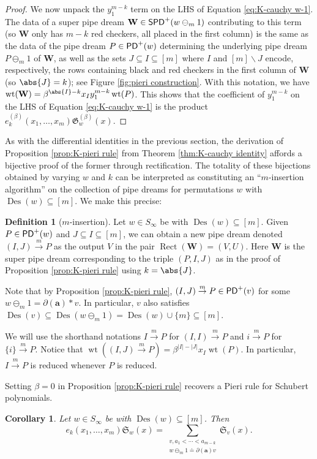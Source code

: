 \documentclass[11pt,reqno]{amsart} %
\newcommand{\frakS}{\mathfrak{S}}
\newcommand{\frakG}{\mathfrak{G}}
\newcommand{\bfa}{\mathbf{a}}
\newcommand{\bfW}{\mathbf{W}}
\newcommand{\sseq}{\subseteq}
\newcommand{\sm}{\smallsetminus}
\newcommand{\msert}{\overset{m}{\rightarrow}}
\DeclareMathOperator{\Des}{Des}
\DeclareMathOperator{\wt}{wt}
\DeclareMathOperator{\PD}{\sf{PD}}
\DeclareMathOperator{\SPD}{\sf{SPD}}
\DeclareMathOperator{\Rect}{Rect} %
\newtheorem{corollary}[theorem]{Corollary}
\theoremstyle{definition}
\newtheorem{definition}[theorem]{Definition}
\begin{document}
\begin{proof}
We now unpack the $y_1^{m-k}$ term on the LHS of Equation \ref{eq:K-cauchy w-1}.
The data of a super pipe dream $\bfW\in \SPD^+(w\ominus_m 1)$ contributing to this term (so $\bfW$ only has $m-k$ red checkers, all placed in the first column) is the same as the data of the pipe dream $P\in \PD^+(w)$ determining the underlying pipe dream $P\ominus_m 1$ of $\bfW$, as well as the sets $J\sseq I\sseq [m]$ where $I$ and $[m]\sm J$ encode, respectively, the rows containing black and red checkers in the first column of $\bfW$ (so $\abs{J} = k$); see Figure \ref{fig:pieri construction}.
With this notation, we have $\wt(\bfW) = \beta^{\abs{I}-k}x_Iy_1^{m-k}\wt(P)$.
This shows that the coefficient of $y_1^{m-k}$ on the LHS of Equation \ref{eq:K-cauchy w-1} is the product $e_k^{(\beta)}(x_1,\dots,x_m)\frakG_w^{(\beta)}(x)$.
\end{proof}

As with the differential identities in the previous section, the derivation of Proposition \ref{prop:K-pieri rule} from Theorem \ref{thm:K-cauchy identity} affords a bijective proof of the former through rectification.
The totality of these bijections obtained by varying $w$ and $k$ can be interpreted as constituting an ``$m$-insertion algorithm'' on the collection of pipe dreams for permutations $w$ with $\Des(w)\sseq [m]$.
We make this precise:

\begin{definition}[$m$-insertion]
\label{def:insertion}
Let $w\in S_\infty$ be with $\Des(w)\sseq [m]$.
Given $P\in \PD^+(w)$ and $J\sseq I\sseq [m]$, we can obtain a new pipe dream denoted $(I,J)\msert P$ as the output $V$ in the pair $\Rect(\bfW) = (V,U)$.
Here $\bfW$ is the super pipe dream corresponding to the triple $(P,I,J)$ as in the proof of Proposition \ref{prop:K-pieri rule} using $k = \abs{J}$.
\end{definition}

Note that by Proposition \ref{prop:K-pieri rule}, $(I,J)\msert P\in \PD^+(v)$ for some $w\ominus_m 1 = \partial(\bfa)*v$.
In particular, $v$ also satisfies $\Des(v)\sseq \Des(w \ominus_m 1) = \Des(w)\cup \{m\} \sseq [m]$.

We will use the shorthand notations $I\msert P$ for $(I,I)\msert P$ and $i\msert P$ for $\{i\}\msert P$.
Notice that $\wt((I,J)\msert P) = \beta^{|I|-|J|} x_I \wt(P)$.
In particular, $I\msert P$ is reduced whenever $P$ is reduced.

Setting $\beta=0$ in Proposition \ref{prop:K-pieri rule} recovers a Pieri rule for Schubert polynomials.
\begin{corollary}
\label{cor:pieri rule}
Let $w\in S_\infty$ be with $\Des(w)\sseq [m]$.
Then \[
    e_k(x_1,\dots,x_m) \frakS_w(x)
    = \sum_{\substack{
        v, a_1 < \cdots < a_{m-k} \\
        w\ominus_m 1 \doteq \partial(\bfa) v
    }}
    \frakS_v(x).
\]
\end{corollary}
\end{document}
